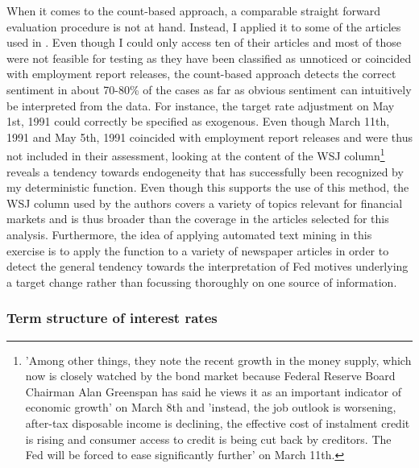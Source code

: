 When it comes to the count-based approach, a comparable straight forward evaluation procedure is not at hand. Instead, I applied it to some of the articles used in \textcite{Ellingsen.2003}. Even though I could only access ten of their articles and most of those were not feasible for testing as they have been classified as unnoticed or coincided with employment report releases, the count-based approach detects the correct sentiment in about 70-80\% of the cases as far as obvious sentiment can intuitively be interpreted from the data. 
%
For instance, the target rate adjustment on May 1st, 1991 could correctly be specified as exogenous. Even though March 11th, 1991 and May 5th, 1991 coincided with employment report releases and were thus not included in their assessment, looking at the content of the WSJ column\footnote{'Among other things, they note the recent growth in the money supply, which now is closely watched by the bond market because Federal Reserve Board Chairman Alan Greenspan has said he views it as an important indicator of economic growth' on March 8th and 'instead, the job outlook is worsening, after-tax disposable income is declining, the effective cost of instalment credit is rising and consumer access to credit is being cut back by creditors. The Fed will be forced to ease significantly further' on March 11th.} reveals a tendency towards endogeneity that has successfully been recognized by my deterministic function.
%
Even though this supports the use of this method, the WSJ column used by the authors covers a variety of topics relevant for financial markets and is thus broader than the coverage in the articles selected for this analysis. Furthermore, the idea of applying automated text mining in this exercise is to apply the function to a variety of newspaper articles in order to detect the general tendency towards the interpretation of Fed motives underlying a target change rather than focussing thoroughly on one source of information.
% 

%
\subsubsection{Term structure of interest rates}

